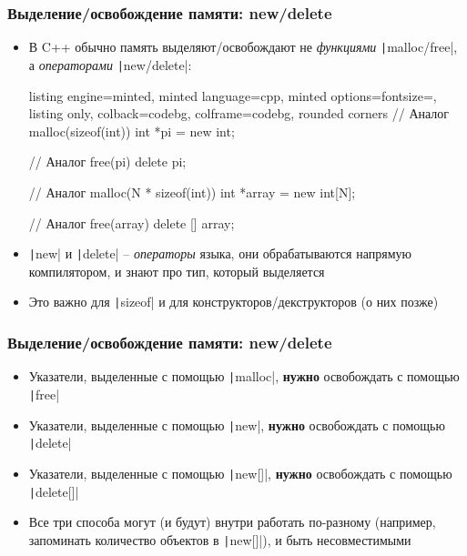 \documentclass[10pt]{beamer}
\begin{document}
\begin{frame}[fragile]
\frametitle{Выделение/освобождение памяти: new/delete}
\begin{itemize}
\item В C++ обычно память выделяют/освобождают не \textit{функциями} \texttt|malloc/free|, а \textit{операторами} \texttt|new/delete|:
\begin{tcblisting}{listing engine=minted, minted language=cpp, minted options={fontsize=\scriptsize}, listing only, colback=codebg, colframe=codebg, rounded corners}
// Аналог malloc(sizeof(int))
int *pi = new int;

// Аналог free(pi)
delete pi;

// Аналог malloc(N * sizeof(int))
int *array = new int[N];

// Аналог free(array)
delete [] array;
\end{tcblisting}
\pause
{}
\item \texttt|new| и \texttt|delete| -- \textit{операторы} языка, они обрабатываются напрямую компилятором, и знают про тип, который выделяется
\pause
\item Это важно для \texttt|sizeof| и для конструкторов/декструкторов (о них позже)
\end{itemize}
\end{frame}

\begin{frame}[fragile]
\frametitle{Выделение/освобождение памяти: new/delete}
\begin{itemize}
\item Указатели, выделенные с помощью \texttt|malloc|, \textbf{нужно} освобождать с помощью \texttt|free|
\pause
\item Указатели, выделенные с помощью \texttt|new|, \textbf{нужно} освобождать с помощью \texttt|delete|
\pause
\item Указатели, выделенные с помощью \texttt|new[]|, \textbf{нужно} освобождать с помощью \texttt|delete[]|
\pause
\item Все три способа могут (и будут) внутри работать по-разному (например, запоминать количество объектов в \texttt|new[]|), и быть несовместимыми
\end{itemize}
\end{frame}
\end{document}
